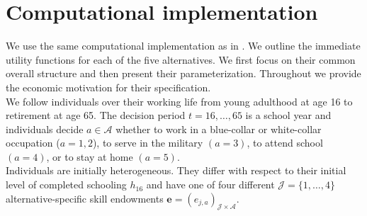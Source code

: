\section{Computational implementation}\label{Computational implementation}
We use the same computational implementation as in \citet{Keane.1997}. We outline the immediate utility functions for each of the five alternatives. We first focus on their common overall structure and then present their parameterization. Throughout we provide the economic motivation for their specification.\\

\noindent We follow individuals over their working life from young adulthood at age 16 to retirement at age 65. The decision period $t = 16, \dots, 65$  is a school year and individuals decide $a\in\mathcal{A}$ whether to work in a blue-collar or white-collar occupation ($a = 1, 2$), to serve in the military $(a = 3)$, to attend school $(a = 4)$, or to stay at home $(a = 5)$.\\

\noindent Individuals are initially heterogeneous. They differ with respect to their initial level of completed schooling $h_{16}$ and have one of four different $\mathcal{J} = \{1, \hdots, 4\}$ alternative-specific skill endowments $\bm{e} = \left(e_{j,a}\right)_{\mathcal{J} \times \mathcal{A}}$.\\


